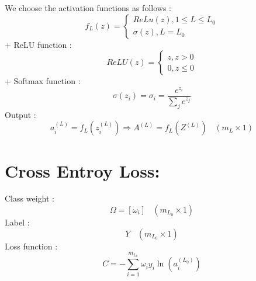 \documentclass{article}
\begin{document}
    We choose the activation functions as follows :
    \[
        f_L(z) = \begin{cases}
            ReLu(z), 1 \leq L \le L_0 \\
            \sigma(z), L = L_0
        \end{cases}
    \]
    + ReLU function : 
    \[
        ReLU(z) = \begin{cases}
            z, z > 0 \\
            0, z \leq 0
        \end{cases}
    \]
    + Softmax function : 
    \[
        \sigma(z_i) = \sigma_i = \frac{e^{z_i}}{\sum_{j}e^{z_j}}
    \]
    Output : 
    \[ 
        a^{(L)}_i = f_L(z^{(L)}_i)
        \Rightarrow A^{(L)} = f_L(Z^{(L)}) \ \ \ \ (m_L \times 1)
    \] 
    \section*{Cross Entroy Loss:}
    Class weight : 
    \[
        \Omega = [\omega_i] \ \ \ \ (m_{L_0} \times 1)
    \]
    Label : 
    \[
        Y \ \ \ \ (m_{L_0} \times 1)
    \]
    Loss function :
    \[
        C = -\sum_{i = 1}^{m_{L_0}}\omega_iy_i\ln\left(
            a^{(L_0)}_i
        \right)
    \]
\end{document}
